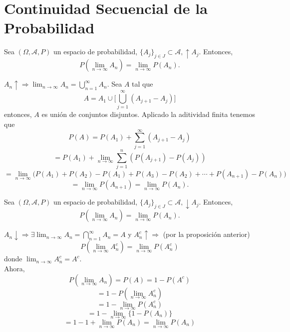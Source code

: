 \section{Continuidad Secuencial de la Probabilidad}

\begin{theo}
  Sea $(\Omega, \mathcal{A}, P)$ un espacio de probabilidad, $\{ A_{j} \}_{j \in J} \subset \mathcal{A}, \uparrow A_{j}$. Entonces, 
  \[ 
    P(\lim_{n \to \infty} A_{n}) = \lim_{n \to \infty} P(A_{n}).
  \] 
\end{theo}

\begin{dem}
  $A_{n} \uparrow \Rightarrow \lim_{n \to \infty} A_{n} = \bigcup_{n = 1}^{\infty} A_{n} $. Sea $A$ tal que
  \[
    A = A_{1} \cup \Bigg[ \bigcup_{j = 1}^{\infty} (A_{j+1} - A_{j}) \Bigg]
  \]
  entonces, $A$ es unión de conjuntos disjuntos. Aplicado la aditividad finita tenemos que 
  \[ 
    P(A) = P(A_{1}) + \sum_{j =1}^{\infty} (A_{j+1} - A_{j})  
  \] 
  \[ 
    = P(A_{1}) + \lim_{n \to \infty} \sum_{j = 1}^{n} (P(A_{j+1}) - P(A_{j})) 
  \] 
  \[ 
    = \lim_{n \to \infty} \big ( P(A_{1}) + P(A_{2}) - P(A_{1}) + P(A_{3}) - P(A_{2}) + \cdots + P(A_{n+1})- P(A_{n}) \big )
  \] 
  \[ 
    = \lim_{n \to \infty} P(A_{n+1}) = \lim_{n \to \infty} P(A_{n}) .
  \] 
\end{dem}

\begin{theo}
  Sea $(\Omega, \mathcal{A}, P)$ un espacio de probabilidad, $\{ A_{j} \}_{j \in J} \subset \mathcal{A}, \downarrow A_{j}$. Entonces, 
  \[ 
    P(\lim_{n \to \infty} A_{n}) = \lim_{n \to \infty} P(A_{n}).
  \] 
\end{theo}

\begin{dem}
  $A_{n} \downarrow \Rightarrow \exists \lim_{n \to \infty} A_{n} = \bigcap_{n=1}^{\infty} A_{n} = A$ y $A^{c}_{n} \uparrow \Rightarrow$ (por la proposición anterior) 
  \[ 
    P(\lim_{n \to \infty} A^c_{n}) = \lim_{n \to \infty} P(A^{c}_{n})  
  \] 
  donde $\lim_{n \to \infty} A^c_{n} = A^c$. \\ 

  Ahora,
  \[ 
    P(\lim_{n \to \infty} A_{n}) = P(A) = 1 - P(A^c) 
  \]
  \[ 
    = 1 - P(\lim_{n \to \infty} A_{n}^c)  
  \] 
  \[ 
    = 1 - \lim_{n \to \infty} P(A_{n}^c) 
  \]
  \[ 
    = 1 - \lim_{n \to \infty} \big\{ 1 - P(A_{n}) \big\}  
  \] 
  \[
    = 1 - 1 + \lim_{n \to \infty} P(A_{n}) = \lim_{n \to \infty} P(A_{n})
  \] 
\end{dem}

